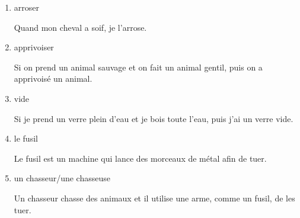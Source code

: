 \documentclass[letterpaper]{article}
\begin{document}
\doublespacing
\begin{enumerate}
\item arroser

Quand mon cheval a soif, je l'arrose.
\item apprivoiser

Si on prend un animal sauvage et on fait un animal gentil, puis on a apprivoisé un animal.

\item vide

Si je prend un verre plein d'eau et je bois toute l'eau, puis j'ai un verre vide.
\item le fusil

Le fusil est un machine qui lance des morceaux de métal afin de tuer.
\item un chasseur/une chasseuse

Un chasseur chasse des animaux et il utilise une arme, comme un fusil, de les tuer.
\end{enumerate}
\end{document}
